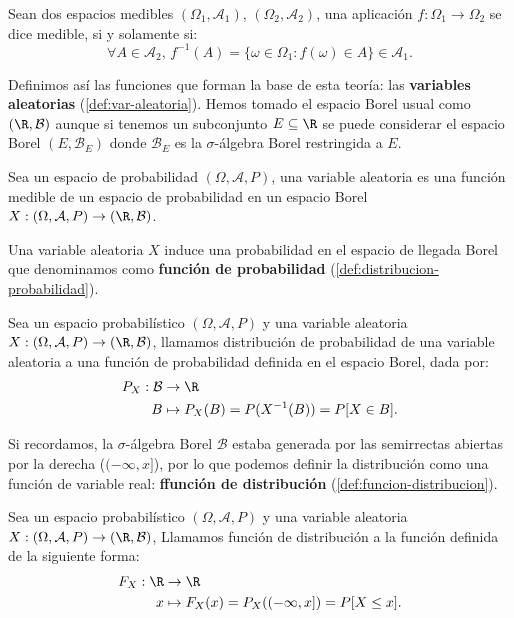 \begin{definicion}
  Sean dos espacios medibles $(\Omega_1, \mathcal{A}_1)$, $(\Omega_2, \mathcal{A}_2)$, una aplicación $f : \Omega_1 \to \Omega_2$ se dice medible, si y solamente si:
  $$\forall A \in \mathcal{A}_2, \, f^{-1}(A) = \{\omega \in \Omega_1 : f(\omega) \in A\} \in \mathcal{A}_1.$$
  \label{def:aplicacion-medible}
\end{definicion}

Definimos así las funciones que forman la base de esta teoría: las \textbf{variables aleatorias} (\autoref{def:var-aleatoria}). Hemos tomado el espacio Borel usual como $(\R, \mathcal{B})$ aunque si tenemos un subconjunto $E \subseteq \R$ se puede considerar el espacio Borel $(E, \mathcal{B}_E)$ donde $\mathcal{B}_E$ es la $\sigma$-álgebra Borel restringida a $E$.

\begin{definicion}
  Sea un espacio de probabilidad $(\Omega, \mathcal{A}, P)$, una variable aleatoria es una función medible de un espacio de probabilidad en un espacio Borel $X: (\Omega, \mathcal{A}, P) \to (\R, \mathcal{B})$.
  \label{def:var-aleatoria}
\end{definicion}

Una variable aleatoria $X$ induce una probabilidad en el espacio de llegada Borel que denominamos como \textbf{función de probabilidad} (\autoref{def:distribucion-probabilidad}).

\begin{definicion}
  Sea un espacio probabilístico $(\Omega, \mathcal{A}, P)$ y una variable aleatoria $X: (\Omega, \mathcal{A}, P) \to (\R, \mathcal{B})$, llamamos distribución de probabilidad de una variable aleatoria a una función de probabilidad definida en el espacio Borel, dada por:
  $$\begin{aligned} P_X : \mathcal{B} & \to \R \\
      B & \mapsto P_X(B) = P(X^{-1}(B)) = P[X \in B].
    \end{aligned}$$
  \label{def:distribucion-probabilidad}
\end{definicion}

Si recordamos, la $\sigma$-álgebra Borel $\mathcal{B}$ estaba generada por las semirrectas abiertas por la derecha ($(-\infty, x]$), por lo que podemos definir la distribución como una función de variable real: \textbf{ffunción de distribución} (\autoref{def:funcion-distribucion}).

\begin{definicion}
  Sea un espacio probabilístico $(\Omega, \mathcal{A}, P)$ y una variable aleatoria $X: (\Omega, \mathcal{A}, P) \to (\R, \mathcal{B})$, Llamamos función de distribución a la función definida de la siguiente forma:
  $$\begin{aligned} F_X : \R & \to \R \\
      x & \mapsto F_X(x) = P_X((-\infty, x]) = P[X \leq x].
    \end{aligned}$$
\label{def:funcion-distribucion}
\end{definicion}

